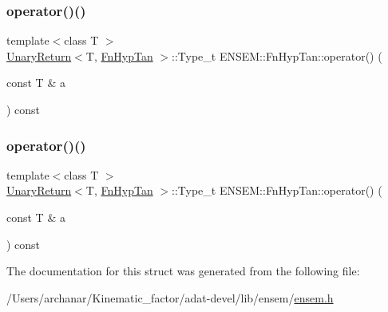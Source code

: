 \mbox{\label{structENSEM_1_1FnHypTan_a2a798b36a9dd79d1189263a0c58e0def}} 
\subsubsection{\texorpdfstring{operator()()}{operator()()}\hspace{0.1cm}{\footnotesize\ttfamily [2/3]}}
{\footnotesize\ttfamily template$<$class T $>$ \\
\mbox{\hyperlink{structENSEM_1_1UnaryReturn}{Unary\+Return}}$<$T, \mbox{\hyperlink{structENSEM_1_1FnHypTan}{Fn\+Hyp\+Tan}} $>$\+::Type\+\_\+t E\+N\+S\+E\+M\+::\+Fn\+Hyp\+Tan\+::operator() (\begin{DoxyParamCaption}\item[{const T \&}]{a }\end{DoxyParamCaption}) const\hspace{0.3cm}{\ttfamily [inline]}}

\mbox{\label{structENSEM_1_1FnHypTan_a2a798b36a9dd79d1189263a0c58e0def}} 
\subsubsection{\texorpdfstring{operator()()}{operator()()}\hspace{0.1cm}{\footnotesize\ttfamily [3/3]}}
{\footnotesize\ttfamily template$<$class T $>$ \\
\mbox{\hyperlink{structENSEM_1_1UnaryReturn}{Unary\+Return}}$<$T, \mbox{\hyperlink{structENSEM_1_1FnHypTan}{Fn\+Hyp\+Tan}} $>$\+::Type\+\_\+t E\+N\+S\+E\+M\+::\+Fn\+Hyp\+Tan\+::operator() (\begin{DoxyParamCaption}\item[{const T \&}]{a }\end{DoxyParamCaption}) const\hspace{0.3cm}{\ttfamily [inline]}}



The documentation for this struct was generated from the following file\+:\begin{DoxyCompactItemize}
\item 
/\+Users/archanar/\+Kinematic\+\_\+factor/adat-\/devel/lib/ensem/\mbox{\hyperlink{adat-devel_2lib_2ensem_2ensem_8h}{ensem.\+h}}\end{DoxyCompactItemize}
